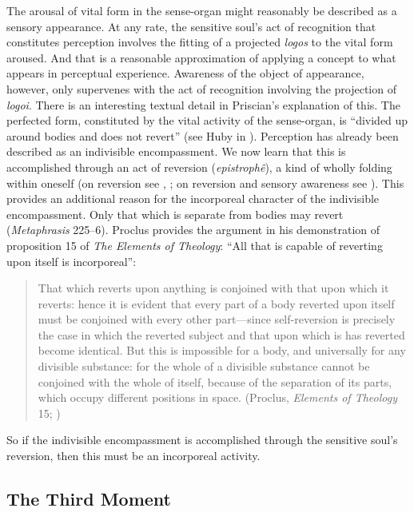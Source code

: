 \documentclass[12pt]{article}
\begin{document}
The arousal of vital form in the sense-organ might reasonably be described as a sensory appearance. At any rate, the sensitive soul's act of recognition that constitutes perception involves the fitting of a projected \emph{logos} to the vital form aroused. And that is a reasonable approximation of applying a concept to what appears in perceptual experience. Awareness of the object of appearance, however, only supervenes with the act of recognition involving the projection of \emph{logoi}. There is an interesting textual detail in Priscian's explanation of this. The perfected form, constituted by the vital activity of the sense-organ, is ``divided up around bodies and does not revert'' (see Huby in \citealt[51 n.31]{Sorabji:1997ly}). Perception has already been described as an indivisible encompassment. We now learn that this is accomplished through an act of reversion (\emph{epistrophê}), a kind of wholly folding within oneself (on reversion see \citealt[212--223]{Dodds:1963ul}, \citealt[126-30]{Lloyd:1990dp}; on reversion and sensory awareness see \citealt{Lautner:1994cs}). This provides an additional reason for the incorporeal character of the indivisible encompassment. Only that which is separate from bodies may revert (\emph{Metaphrasis} 225--6). Proclus provides the argument in his demonstration of proposition 15 of \emph{The Elements of Theology}: ``All that is capable of reverting upon itself is incorporeal'':
\begin{quote}
	That which reverts upon anything is conjoined with that upon which it reverts: hence it is evident that every part of a body reverted upon itself must be conjoined with every other part---since self-reversion is precisely the case in which the reverted subject and that upon which is has reverted become identical. But this is impossible for a body, and universally for any divisible substance: for the whole of a divisible substance cannot be conjoined with the whole of itself, because of the separation of its parts, which occupy different positions in space. (Proclus, \emph{Elements of Theology} 15; \citealt[18--19]{Dodds:1963ul})
\end{quote}
So if the indivisible encompassment is accomplished through the sensitive soul's reversion, then this must be an incorporeal activity. 


\subsection{The Third Moment} %
\label{sub:the_third_moment}
\end{document}

